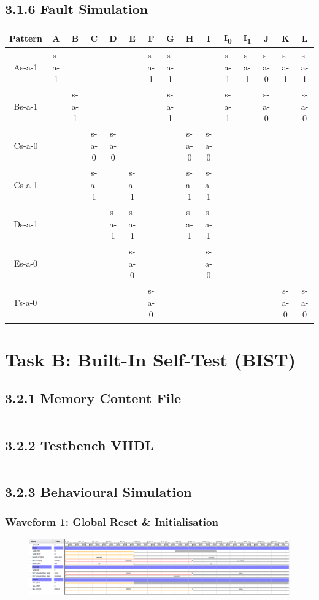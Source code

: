 \documentclass[11pt]{report}
\begin{document}
\section*{3.1.6 Fault Simulation}
\begin{tabular}{|c||c|c|c|c|c|c|c|c|c|c|c|c|c|c|}
\hline
Pattern & A & B & C & D & E & F & G & H & I & I\textsubscript{0} & I\textsubscript{1} & J & K & L \\
\hline
\hline
As-a-1 & s-a-1 & & & & & s-a-1 & s-a-1 & & & s-a-1 & s-a-1 & s-a-0 & s-a-1 & s-a-1 \\
\hline
Bs-a-1 & & s-a-1 & & & & & s-a-1 & & & s-a-1 & & s-a-0 & & s-a-0 \\
\hline
Cs-a-0 & & & s-a-0 & s-a-0 & & & & s-a-0 & s-a-0 & & & & & \\
\hline
Cs-a-1 & & & s-a-1 & & s-a-1 & & & s-a-1 & s-a-1 & & & & & \\
\hline
Ds-a-1 & & & & s-a-1 & s-a-1 & & & s-a-1 & s-a-1 & & & & & \\
\hline
Es-a-0 & & & & & s-a-0 & & & & s-a-0 & & & & & \\
\hline
Fs-a-0 & & & & & & s-a-0 & & & & & & & s-a-0 & s-a-0 \\
\hline
\end{tabular}



\chapter*{Task B: Built-In Self-Test (BIST)}


\section*{3.2.1 Memory Content File}
\inputminted{text}{"../../DE_Lab4/DE_Lab4.srcs/sources_1/imports/Desktop/lab4_coefficient.coe"}


\section*{3.2.2 Testbench VHDL}
\inputminted{vhdl}{"../../DE_Lab4/DE_Lab4.srcs/sim_1/new/bist_tb.vhd"}



\section*{3.2.3 Behavioural Simulation}

\subsection*{Waveform 1: Global Reset \& Initialisation}
\begin{figure}[H]
    \includegraphics[width=\columnwidth]{Reports/Lab4/Assets/3.2.3_reset.png}
\end{figure}
\end{document}
